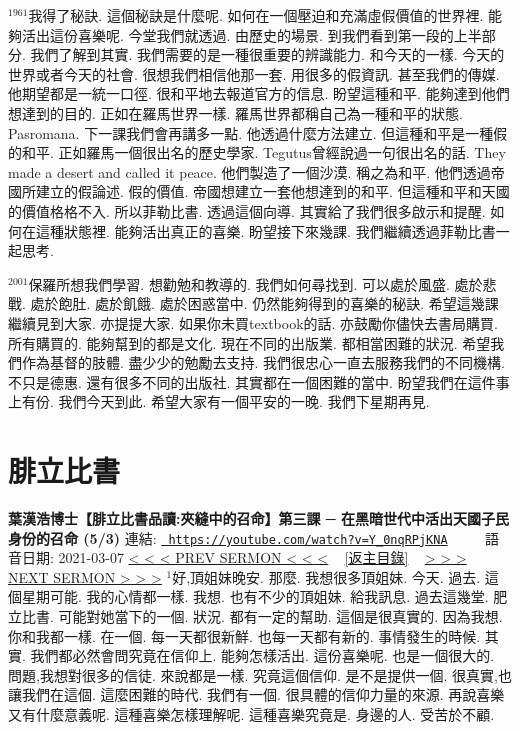 \documentclass{book}
\begin{document}
$^{1961}$我得了秘訣.
這個秘訣是什麼呢.
如何在一個壓迫和充滿虛假價值的世界裡.
能夠活出這份喜樂呢.
今堂我們就透過.
由歷史的場景.
到我們看到第一段的上半部分.
我們了解到其實.
我們需要的是一種很重要的辨識能力.
和今天的一樣.
今天的世界或者今天的社會.
很想我們相信他那一套.
用很多的假資訊.
甚至我們的傳媒.
他期望都是一統一口徑.
很和平地去報道官方的信息.
盼望這種和平.
能夠達到他們想達到的目的.
正如在羅馬世界一樣.
羅馬世界都稱自己為一種和平的狀態.
Pasromana.
下一課我們會再講多一點.
他透過什麼方法建立.
但這種和平是一種假的和平.
正如羅馬一個很出名的歷史學家.
Tegutus曾經說過一句很出名的話.
They made a desert and called it peace.
他們製造了一個沙漠.
稱之為和平.
他們透過帝國所建立的假論述.
假的價值.
帝國想建立一套他想達到的和平.
但這種和平和天國的價值格格不入.
所以菲勒比書.
透過這個向導.
其實給了我們很多啟示和提醒.
如何在這種狀態裡.
能夠活出真正的喜樂.
盼望接下來幾課.
我們繼續透過菲勒比書一起思考.

$^{2001}$保羅所想我們學習.
想勸勉和教導的.
我們如何尋找到.
可以處於風盛.
處於悲戰.
處於飽肚.
處於飢餓.
處於困惑當中.
仍然能夠得到的喜樂的秘訣.
希望這幾課繼續見到大家.
亦提提大家.
如果你未買textbook的話.
亦鼓勵你儘快去書局購買.
所有購買的.
能夠幫到的都是文化.
現在不同的出版業.
都相當困難的狀況.
希望我們作為基督的肢體.
盡少少的勉勵去支持.
我們很忠心一直去服務我們的不同機構.
不只是德惠.
還有很多不同的出版社.
其實都在一個困難的當中.
盼望我們在這件事上有份.
我們今天到此.
希望大家有一個平安的一晚.
我們下星期再見.
\newpage



\section{腓立比書}
\label{sec:Y_0nqRPjKNA}
\textbf{葉漢浩博士【腓立比書品讀:夾縫中的召命】第三課 ─ 在黑暗世代中活出天國子民身份的召命 (5/3)}
\newline
\newline
連結: \href{https://youtube.com/watch?v=Y_0nqRPjKNA}{\texttt{ https://youtube.com/watch?v=Y\_0nqRPjKNA}} ~~~~ 語音日期: 2021-03-07 
\newline
\newline
\hyperref[sec:V3TY9OLIKOY]{\small{< < < PREV SERMON < < <}}
~
\hyperref[sec:index]{\small{[返主目錄]}}
~
\hyperref[sec:mVawzgk9_PE]{\small{> > > NEXT SERMON > > >}}
\newline
\newline
$^{1}$好,頂姐妹晚安.
那麼.
我想很多頂姐妹.
今天.
過去.
這個星期可能.
我的心情都一樣.
我想.
也有不少的頂姐妹.
給我訊息.
過去這幾堂.
肥立比書.
可能對她當下的一個.
狀況.
都有一定的幫助.
這個是很真實的.
因為我想.
你和我都一樣.
在一個.
每一天都很新鮮.
也每一天都有新的.
事情發生的時候.
其實.
我們都必然會問究竟在信仰上.
能夠怎樣活出.
這份喜樂呢.
也是一個很大的.
問題,我想對很多的信徒.
來說都是一樣.
究竟這個信仰.
是不是提供一個.
很真實,也讓我們在這個.
這麼困難的時代.
我們有一個.
很具體的信仰力量的來源.
再說喜樂又有什麼意義呢.
這種喜樂怎樣理解呢.
這種喜樂究竟是.
身邊的人.
受苦於不顧.
\end{document}
